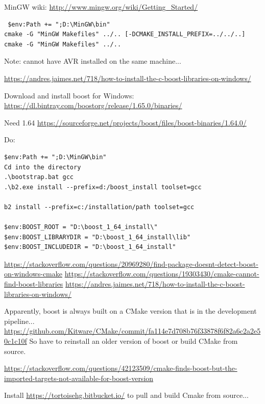 \documentclass[12pt]{report}
\begin{document}
MinGW wiki: \url{http://www.mingw.org/wiki/Getting_Started/}
\begin{lstlisting}
 $env:Path += ";D:\MinGW\bin"
cmake -G "MinGW Makefiles" ../.. [-DCMAKE_INSTALL_PREFIX=../../..]
cmake -G "MinGW Makefiles" ../..
\end{lstlisting}
Note: cannot have AVR installed on the same machine...

\url{https://andres.jaimes.net/718/how-to-install-the-c-boost-libraries-on-windows/}

Download and install boost for Windows: \url{https://dl.bintray.com/boostorg/release/1.65.0/binaries/}

Need 1.64 \url{https://sourceforge.net/projects/boost/files/boost-binaries/1.64.0/}

Do:
\begin{lstlisting}
$env:Path += ";D:\MinGW\bin"
Cd into the directory
.\bootstrap.bat gcc
.\b2.exe install --prefix=d:/boost_install toolset=gcc

b2 install --prefix=c:/installation/path toolset=gcc

$env:BOOST_ROOT = "D:\boost_1_64_install\"
$env:BOOST_LIBRARYDIR = "D:\boost_1_64_install\lib"
$env:BOOST_INCLUDEDIR = "D:\boost_1_64_install"
\end{lstlisting}

\url{https://stackoverflow.com/questions/20969280/find-package-doesnt-detect-boost-on-windows-cmake}
\url{https://stackoverflow.com/questions/19303430/cmake-cannot-find-boost-libraries}
\url{https://andres.jaimes.net/718/how-to-install-the-c-boost-libraries-on-windows/}


Apparently, boost is always built on a CMake version that is in the development pipeline... \url{https://github.com/Kitware/CMake/commit/fa114e7d708b76f33878f6f82a6c2a2e50c1c10f} So have to reinstall an older version of boost or build CMake from source.

\url{https://stackoverflow.com/questions/42123509/cmake-finds-boost-but-the-imported-targets-not-available-for-boost-version}

Install \url{https://tortoisehg.bitbucket.io/} to pull and build Cmake from source...



\singlespacing
\end{document}

